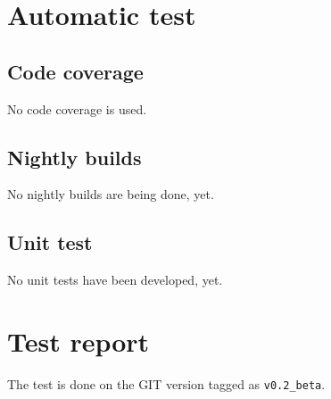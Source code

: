 \documentclass[a4paper,titlepage]{article}
\begin{document}
\newpage
\section{Automatic test}
\subsection{Code coverage}
No code coverage is used.
\subsection{Nightly builds}
No nightly builds are being done, yet.
\subsection{Unit test}

No unit tests have been developed, yet.

\newpage
\section{Test report}
The test is done on the GIT version tagged as \texttt{v0.2\_beta}.\\
\end{document}
